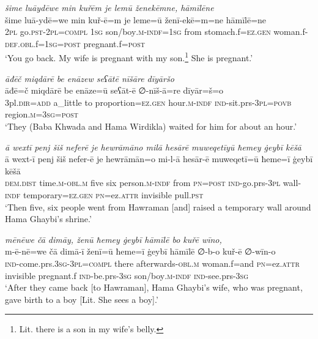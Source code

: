 \ea \label{BP.185}
\textit{šime luāydēwe min kuřēm je lemū ženekēmne, hāmīlēne} \\ 
\gll šime luā-ydē=we min kuř-ē=m je leme=ū ženī-ekē=m=ne hāmīlē=ne \\ 
 \textsc{2pl} go\textsc{.pst}-\textsc{2pl}\textsc{=compl} \textsc{1sg} son/boy\textsc{.m}\textsc{-indf}\textsc{=\textsc{1sg}} from stomach.f\textsc{=ez.gen} woman.f\textsc{-def}\textsc{.obl}.f\textsc{=\textsc{1sg}}\textsc{=\textsc{post}} pregnant.f\textsc{=\textsc{post}} \\ 
\glt `You go back. My wife is pregnant with my son.\footnote{Lit. there is a son in my wife’s belly.} She is pregnant.'
\z 
 
\ea \label{BP.189}
\textit{āđēč miqdārē be enāzew seʕātē nīšāre dīyāršo} \\ 
\gll āđē=č miqdārē be enāze=ū seʕāt-ē ∅-nīš-ā=re dīyār=š=o \\ 
 3pl\textsc{.dir}\textsc{=add} a\_little to proportion\textsc{=ez.gen} hour\textsc{.m}\textsc{-indf} \textsc{ind-}sit.prs\textsc{-3pl}\textsc{=\textsc{povb}} region\textsc{.m}\textsc{=3sg}\textsc{=\textsc{post}} \\ 
\glt `They (Baba Khwada and Hama Wirdikla) waited for him for about an hour.'
\z 
 
\ea \label{BP.203}
\textit{ā wextī penj šiš neferē je hewrāmāno milā hesārē muweqetīyū ħemey ġeybī kēšā} \\ 
\gll ā wext-ī penj šiš nefer-ē je hewrāmān=o mi-l-ā hesār-ē muweqetī=ū ħeme=ī ġeybī kēšā \\ 
 \textsc{dem.dist} time\textsc{.m}\textsc{-obl}\textsc{.m} five six person\textsc{.m}\textsc{-indf} from \textsc{pn}\textsc{=\textsc{post}} \textsc{ind-}go.prs\textsc{-3pl} wall\textsc{-indf} temporary\textsc{=ez.gen} \textsc{pn}=ez.\textsc{attr} invisible pull\textsc{.pst} \\ 
\glt `Then five, six people went from Hawraman [and] raised a temporary wall around Hama Ghaybi’s shrine.'
\z 
 
\ea \label{BP.205}
\textit{mēnēwe čā dimāy, ženū ħemey ġeybī hāmīlē bo kuřē wīno,} \\ 
\gll m-ē-nē=we čā dimā-ī ženī=ū ħeme=ī ġeybī hāmīlē ∅-b-o kuř-ē ∅-wīn-o \\ 
 \textsc{ind-}come.prs\textsc{.3sg}\textsc{-3pl}\textsc{=compl} there afterwards\textsc{-obl}\textsc{.m} woman.f=and \textsc{pn}=ez.\textsc{attr} invisible pregnant.f \textsc{ind-}be.prs\textsc{-3sg} son/boy\textsc{.m}\textsc{-indf} \textsc{ind-}see.prs\textsc{-3sg} \\ 
\glt `After they came back [to Hawraman], Hama Ghaybi’s wife, who was pregnant, gave birth to a boy [Lit. She sees a boy].'
\z 
 
